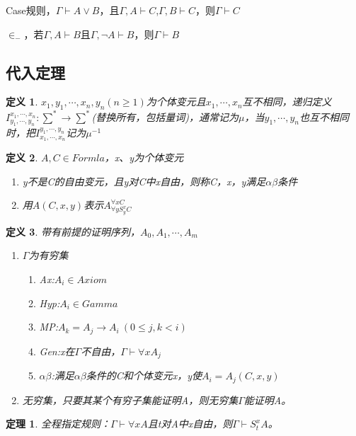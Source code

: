\documentclass[a4paper]{ctexart}
\newtheorem{thm}{\hspace{2em}定理}[subsection]
\newtheorem{defi}{\hspace{2em}定义}[subsection]
\begin{document}
Case规则，$\Gamma\vdash A\vee B$，且$\Gamma,A\vdash C$,$\Gamma,B\vdash C$，则$\Gamma\vdash C$

$\in_-$，若$\Gamma,A\vdash B$且$\Gamma,\neg A\vdash B$，则$\Gamma\vdash B$

\subsection{代入定理}
\begin{defi}
  $x_1,y_1,\cdots,x_n,y_n(n\geq 1)$为个体变元且$x_1,\cdots,x_n$互不相同，递归定义$I^{x_1,\cdots,x_n}_{y_1,\cdots,y_n}:\sum^*\rightarrow \sum^*$(替换所有，包括量词)，通常记为$\mu$，当$y_1,\cdots,y_n$也互不相同时，把$I_{x_1,\cdots,x_n}^{y_1,\cdots,y_n}$记为$\mu^{-1}$
\end{defi}

\begin{defi}
  $A,C\in Formla$，x、y为个体变元
  \begin{enumerate}[itemindent=2em]
    \item y不是C的自由变元，且y对C中x自由，则称C，x，y满足$\alpha\beta$条件
    \item 用$A(C,x,y)$表示$A^{\forall{x}C}_{\forall{y}S_y^xC}$
  \end{enumerate}
\end{defi}

\begin{defi}
  带有前提的证明序列，$A_0,A_1,\cdots,A_m$
  \begin{enumerate}[itemindent=2em]
    \item $\Gamma$为有穷集
    \begin{enumerate}[itemindent=3em]
      \item Ax:$A_i\in Axiom$
      \item Hyp:$A_i\in Gamma$
      \item MP:$A_k=A_j\rightarrow A_i\ (0\leq j,k<i)$
      \item Gen:x在$\Gamma$不自由，$\Gamma\vdash \forall{x}A_j$
      \item $\alpha\beta$:满足$\alpha\beta$条件的C和个体变元x，y使$A_i=A_j(C,x,y)$
    \end{enumerate}
    \item 无穷集，只要其某个有穷子集能证明A，则无穷集$\Gamma$能证明A。
  \end{enumerate}
\end{defi}

\begin{thm}
  全程指定规则：$\Gamma\vdash\forall{x}A$且t对A中x自由，则$\Gamma\vdash S_t^xA$。
\end{thm}
\end{document}
